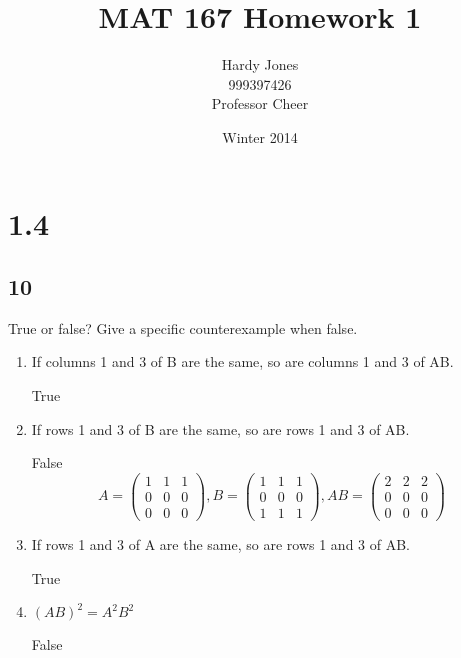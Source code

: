 \documentclass[12pt,letterpaper]{article}
\title{MAT 167 Homework 1\vspace{-2ex}}
\author{Hardy Jones\\
        999397426\\
        Professor Cheer\vspace{-2ex}}
\date{Winter 2014}
\begin{document}
  \maketitle

  \section*{1.4}
    \subsection*{10}
      True or false? Give a speciﬁc counterexample when false.
      \begin{enumerate}
        \item
          If columns 1 and 3 of B are the same, so are columns 1 and 3 of AB.

          True
        \item
          If rows 1 and 3 of B are the same, so are rows 1 and 3 of AB.

          False
          \[
            A = \left(
            \begin{array}{ccc}
              1 & 1 & 1 \\
              0 & 0 & 0 \\
              0 & 0 & 0
            \end{array}
            \right)
            ,
            B = \left(
            \begin{array}{ccc}
              1 & 1 & 1 \\
              0 & 0 & 0 \\
              1 & 1 & 1
            \end{array}
            \right)
            ,
            AB = \left(
            \begin{array}{ccc}
              2 & 2 & 2 \\
              0 & 0 & 0 \\
              0 & 0 & 0
            \end{array}
            \right)
          \]
        \item
          If rows 1 and 3 of A are the same, so are rows 1 and 3 of AB.

          True
        \item
          $(AB)^2 = A^2B^2$

          False


\end{enumerate}
\end{document}
